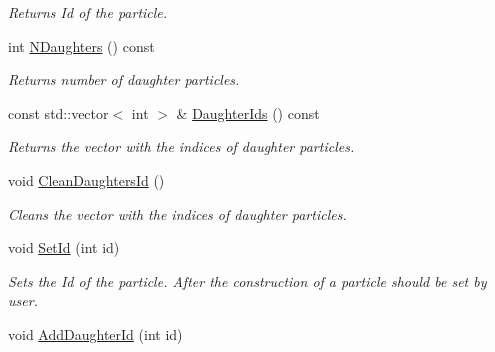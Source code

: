 \begin{DoxyCompactItemize}
\begin{DoxyCompactList}\small\item\em Returns Id of the particle. \end{DoxyCompactList}\item 
int \hyperlink{classKFParticleBase_a5804383f749253e8a17c594ccf463842}{N\+Daughters} () const \hypertarget{classKFParticleBase_a5804383f749253e8a17c594ccf463842}{}\label{classKFParticleBase_a5804383f749253e8a17c594ccf463842}

\begin{DoxyCompactList}\small\item\em Returns number of daughter particles. \end{DoxyCompactList}\item 
const std\+::vector$<$ int $>$ \& \hyperlink{classKFParticleBase_a7f6754ebbbeb73d4c2b88a49b75db474}{Daughter\+Ids} () const \hypertarget{classKFParticleBase_a7f6754ebbbeb73d4c2b88a49b75db474}{}\label{classKFParticleBase_a7f6754ebbbeb73d4c2b88a49b75db474}

\begin{DoxyCompactList}\small\item\em Returns the vector with the indices of daughter particles. \end{DoxyCompactList}\item 
void \hyperlink{classKFParticleBase_a06b53cef25f218f5eb041197455ad0b4}{Clean\+Daughters\+Id} ()\hypertarget{classKFParticleBase_a06b53cef25f218f5eb041197455ad0b4}{}\label{classKFParticleBase_a06b53cef25f218f5eb041197455ad0b4}

\begin{DoxyCompactList}\small\item\em Cleans the vector with the indices of daughter particles. \end{DoxyCompactList}\item 
void \hyperlink{classKFParticleBase_ad223c0ea998d4c27a768291b6288c0c2}{Set\+Id} (int id)\hypertarget{classKFParticleBase_ad223c0ea998d4c27a768291b6288c0c2}{}\label{classKFParticleBase_ad223c0ea998d4c27a768291b6288c0c2}

\begin{DoxyCompactList}\small\item\em Sets the Id of the particle. After the construction of a particle should be set by user. \end{DoxyCompactList}\item 
void \hyperlink{classKFParticleBase_ab29274a82822129a02a2c856e495b8ee}{Add\+Daughter\+Id} (int id)\hypertarget{classKFParticleBase_ab29274a82822129a02a2c856e495b8ee}{}\label{classKFParticleBase_ab29274a82822129a02a2c856e495b8ee}


\end{DoxyCompactItemize}
